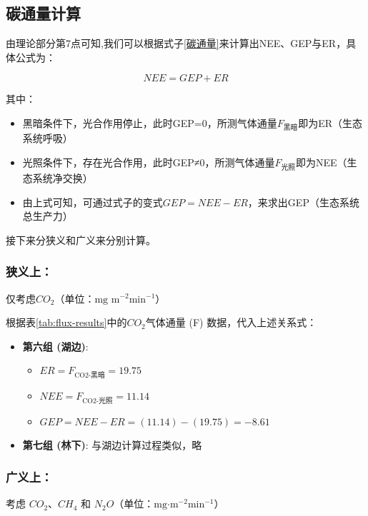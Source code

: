 \documentclass[10.5pt]{config}
\begin{document}
\subsection{碳通量计算}

由理论部分第7点可知,我们可以根据式子\ref{碳通量}来计算出NEE、GEP与ER，具体公式为：

$$NEE=GEP+ER$$

其中：
\begin{itemize}
    \item 黑暗条件下，光合作用停止，此时GEP=0，所测气体通量$F_\text{黑暗}$即为ER（生态系统呼吸）
    \item 光照条件下，存在光合作用，此时GEP≠0，所测气体通量$F_\text{光照}$即为NEE（生态系统净交换）
    \item 由上式可知，可通过式子的变式$GEP=NEE-ER$，来求出GEP（生态系统总生产力）
\end{itemize}

接下来分狭义和广义来分别计算。

\subsubsection{\textbf{狭义上：}}
仅考虑$CO_2$（单位：$\text{mg m}^{-2} \text{min}^{-1}$）
    
    根据表\ref{tab:flux-results}中的$CO_2$气体通量 (F) 数据，代入上述关系式：
    
    \begin{itemize}[leftmargin=*]
        \item \textbf{第六组 (湖边)}:
            \begin{itemize}
                \item $ER = F_\text{CO2-黑暗} = 19.75$
                \item $NEE = F_\text{CO2-光照} = 11.14$
                \item $GEP = NEE - ER = (11.14) - (19.75) = -8.61$
            \end{itemize}
            
        \item \textbf{第七组 (林下)}:
                与湖边计算过程类似，略
    \end{itemize}
    
\subsubsection{\textbf{广义上：}}
考虑 $CO_2$、$CH_4$ 和 $N_2O$（单位：$\text{mg·m}^{-2} \text{min}^{-1}$）
    
\end{document}
